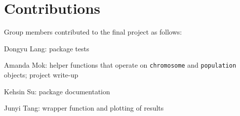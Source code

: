 \documentclass{article}\usepackage[]{graphicx}\usepackage[]{color}
\begin{document}
\section{Contributions}

Group members contributed to the final project as follows:

Dongyu Lang: package tests

Amanda Mok: helper functions that operate on \texttt{chromosome} and \texttt{population} objects; project write-up

Kehsin Su: package documentation

Junyi Tang: wrapper function and plotting of results
\end{document}

